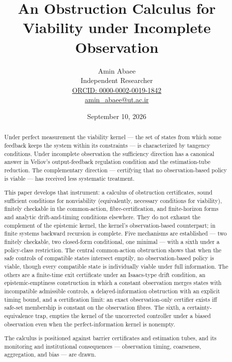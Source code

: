\documentclass[10pt,twocolumn]{article}
\theoremstyle{definition}
\begin{document}
\title{An Obstruction Calculus for Viability under Incomplete Observation}
\author{Amin Abaee\\[0.35em]
{\small Independent Researcher}\\[0.55em]
{\small\href{https://orcid.org/0000-0002-0019-1842}{ORCID: 0000-0002-0019-1842}}\\[0.3em]
{\small\href{mailto:amin\_abaee@ut.ac.ir}{amin\_abaee@ut.ac.ir}}}
\date{September 10, 2026}
\maketitle

\begin{abstract}

Under perfect measurement the viability kernel --- the set of states
from which some feedback keeps the system within its constraints --- is
characterized by tangency conditions. Under incomplete observation the
sufficiency direction has a canonical answer in Veliov's
output-feedback regulation condition and the estimation-tube reduction.
The complementary direction --- certifying that no observation-based
policy is viable --- has received less systematic treatment.

This paper develops that instrument: a calculus of obstruction
certificates, sound sufficient conditions for nonviability (equivalently, necessary conditions for viability), finitely
checkable in the common-action, fibre-certification, and finite-horizon forms and analytic drift-and-timing conditions elsewhere. They do not exhaust the complement of the epistemic kernel, the kernel's observation-based counterpart; in finite systems backward recursion is complete. Five mechanisms are established --- two finitely checkable, two
closed-form conditional, one minimal --- with a sixth under a
policy-class restriction. The central common-action obstruction shows
that when the safe controls of compatible states intersect emptily, no
observation-based policy is viable, though every compatible state is
individually viable under full information. The others are a finite-time
exit certificate under an Isaacs-type drift condition, an
epistemic-emptiness construction in which a constant observation merges
states with incompatible admissible controls, a delayed-information
obstruction with an explicit timing bound, and a certification limit:
an exact observation-only certifier exists iff safe-set
membership is constant on the observation fibres. The sixth, a
certainty-equivalence trap, empties the kernel of the uncorrected controller under a biased
observation even when the perfect-information kernel is nonempty.

The calculus is positioned against barrier certificates and estimation
tubes, and its monitoring and institutional consequences ---
observation timing, coarseness, aggregation, and bias --- are drawn.

\end{abstract}
\end{document}
